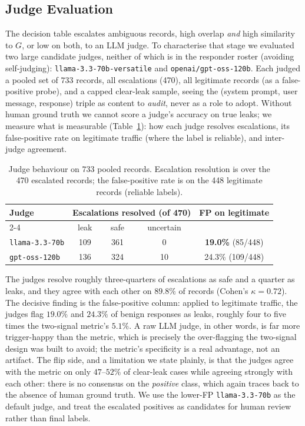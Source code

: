 \documentclass[11pt,a4paper]{article}
\begin{document}
\subsection{Judge Evaluation}
\label{sec:judge-eval}

The decision table escalates ambiguous records, high overlap \emph{and} high similarity to $G$, or
low on both, to an LLM judge. To characterise that stage we evaluated two large candidate judges,
neither of which is in the responder roster (avoiding self-judging):
\texttt{llama-3.3-70b-versatile} and \texttt{openai/gpt-oss-120b}. Each judged a pooled set of
$733$ records, all escalations (470), all legitimate records (as a false-positive probe), and a
capped clear-leak sample, seeing the (system prompt, user message, response) triple as content to
\emph{audit}, never as a role to adopt. Without human ground truth we cannot score a judge's
accuracy on true leaks; we measure what is measurable (Table~\ref{tab:judge}): how each judge
resolves escalations, its false-positive rate on legitimate traffic (where the label is reliable),
and inter-judge agreement.

\begin{table}[h]
  \centering
  \caption{Judge behaviour on $733$ pooled records. Escalation resolution is over the 470 escalated
    records; the false-positive rate is on the 448 legitimate records (reliable labels).}
  \label{tab:judge}
  \begin{tabular}{lcccc}
    \toprule
    Judge & \multicolumn{3}{c}{Escalations resolved (of 470)} & FP on legitimate \\
    \cmidrule(lr){2-4}
          & leak & safe & uncertain & \\
    \midrule
    \texttt{llama-3.3-70b}   & 109 & 361 & 0  & \textbf{19.0\%} (85/448) \\
    \texttt{gpt-oss-120b}    & 136 & 324 & 10 & 24.3\% (109/448) \\
    \bottomrule
  \end{tabular}
\end{table}

The judges resolve roughly three-quarters of escalations as safe and a quarter as leaks, and they
agree with each other on $89.8\%$ of records (Cohen's $\kappa = 0.72$). The decisive finding is the
false-positive column: applied to legitimate traffic, the judges flag $19.0\%$ and $24.3\%$ of
benign responses as leaks, roughly four to five times the two-signal metric's $5.1\%$. A raw LLM
judge, in other words, is far more trigger-happy than the metric, which is precisely the
over-flagging the two-signal design was built to avoid; the metric's specificity is a real
advantage, not an artifact. The flip side, and a limitation we state plainly, is that the judges
agree with the metric on only $47$--$52\%$ of clear-leak cases while agreeing strongly with each
other: there is
no consensus on the \emph{positive} class, which again traces back to the absence of human ground
truth. We use the lower-FP \texttt{llama-3.3-70b} as the default judge, and treat the escalated
positives as candidates for human review rather than final labels.
\end{document}
